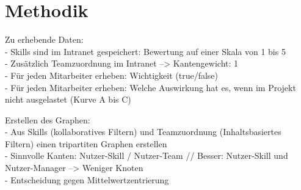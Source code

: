 \chapter{Methodik}
\label{ch:methodik}

Zu erhebende Daten:\\
- Skills sind im Intranet gespeichert: Bewertung auf einer Skala von 1 bis 5\\
- Zusätzlich Teamzuordnung im Intranet --> Kantengewicht: 1\\
- Für jeden Mitarbeiter erheben: Wichtigkeit (true/false)\\
- Für jeden Mitarbeiter erheben: Welche Auswirkung hat es, wenn im Projekt nicht ausgelastet (Kurve A bis C)

Erstellen des Graphen:\\
- Aus Skills (kollaboratives Filtern) und Teamzuordnung (Inhaltsbasiertes Filtern) einen tripartiten Graphen erstellen\\
- Sinnvolle Kanten: Nutzer-Skill / Nutzer-Team // Besser: Nutzer-Skill und Nutzer-Manager --> Weniger Knoten\\
- Entscheidung gegen Mittelwertzentrierung

